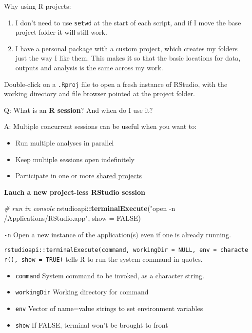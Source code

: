 \documentclass[
]{book}
\newenvironment{Shaded}{\begin{snugshade}}{\end{snugshade}}
\newcommand{\AttributeTok}[1]{\textcolor[rgb]{0.13,0.29,0.53}{#1}}
\newcommand{\CommentTok}[1]{\textcolor[rgb]{0.56,0.35,0.01}{\textit{#1}}}
\newcommand{\ConstantTok}[1]{\textcolor[rgb]{0.56,0.35,0.01}{#1}}
\newcommand{\FunctionTok}[1]{\textcolor[rgb]{0.13,0.29,0.53}{\textbf{#1}}}
\newcommand{\NormalTok}[1]{#1}
\newcommand{\SpecialCharTok}[1]{\textcolor[rgb]{0.81,0.36,0.00}{\textbf{#1}}}
\newcommand{\StringTok}[1]{\textcolor[rgb]{0.31,0.60,0.02}{#1}}
\providecommand{\tightlist}{%
  \setlength{\itemsep}{0pt}\setlength{\parskip}{0pt}}
\begin{document}
Why using R projects:

\begin{enumerate}
\def\labelenumi{\arabic{enumi}.}
\tightlist
\item
  I don't need to use \texttt{setwd} at the start of each script, and if I move the base project folder it will still work.
\item
  I have a personal package with a custom project, which creates my folders just the way I like them. This makes it so that the basic locations for data, outputs and analysis is the same across my work.
\end{enumerate}

Double-click on a \texttt{.Rproj} file to open a fresh instance of RStudio, with the working directory and file browser pointed at the project folder.

Q: What is an \textbf{R session}? And when do I use it?

A: Multiple concurrent sessions can be useful when you want to:

\begin{itemize}
\tightlist
\item
  Run multiple analyses in parallel
\item
  Keep multiple sessions open indefinitely
\item
  Participate in one or more \href{https://support.posit.co/hc/en-us/articles/211659737}{shared projects}
\end{itemize}

\textbf{Lauch a new project-less RStudio session}

\begin{Shaded}
\begin{Highlighting}[]
\CommentTok{\# run in console}
\NormalTok{rstudioapi}\SpecialCharTok{::}\FunctionTok{terminalExecute}\NormalTok{(}\StringTok{"open {-}n /Applications/RStudio.app"}\NormalTok{, }\AttributeTok{show =} \ConstantTok{FALSE}\NormalTok{)}
\end{Highlighting}
\end{Shaded}

\texttt{-n} Open a new instance of the application(s) even if one is already running.

\texttt{rstudioapi::terminalExecute(command,\ workingDir\ =\ NULL,\ env\ =\ character(),\ show\ =\ TRUE)} tells R to run the system command in quotes.

\begin{itemize}
\tightlist
\item
  \texttt{command} System command to be invoked, as a character string.
\item
  \texttt{workingDir} Working directory for command
\item
  \texttt{env} Vector of name=value strings to set environment variables
\item
  \texttt{show} If FALSE, terminal won't be brought to front
\end{itemize}
\end{document}
